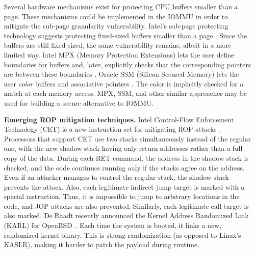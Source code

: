 Several hardware mechanisms exist for protecting CPU buffers smaller than a page. These mechanisms could be implemented in the IOMMU in order to mitigate the sub-page granularity vulnerability. Intel’s sub-page protecting technology suggests protecting fixed-sized buffers smaller than a page \cite{Int18}. Since the buffers are still fixed-sized, the same vulnerability remains, albeit in a more limited way. Intel MPX (Memory Protection Extensions) lets the user define boundaries for buffers and, later, explicitly checks that the corresponding pointers are between these boundaries \cite{Int16a}. Oracle SSM (Silicon Secured Memory) lets the user \emph{color} buffers and associative pointers \cite{Ora15}. The color is implicitly checked for a match at each memory access. MPX, SSM, and other similar approaches may be used for building a secure alternative to IOMMU. 

\smallskip
\noindent\textbf{Emerging ROP mitigation techniques.}
Intel Control-Flow Enforcement Technology (CET) is a new instruction set for mitigating ROP attacks \cite{Int17}. Processors that support CET use two stacks simultaneously instead of the regular one, with the new shadow stack having only return addresses rather than a full copy of the data. During each RET command, the address in the shadow stack is checked, and the code continues running only if the stacks agree on the address. Even if an attacker manages to control the regular stack, the shadow stack prevents the attack. Also, each legitimate indirect jump target is marked with a special instruction. Thus, it is impossible to jump to arbitrary locations in the code, and JOP attacks are also prevented. Similarly, each legitimate call target is also marked. De Raadt recently announced the Kernel Address Randomized Link (KARL) for OpenBSD~\cite{dr17}. Each time the system is booted, it links a new, randomized kernel binary. This is strong randomization (as opposed to Linux’s KASLR), making it harder to patch the payload during runtime. 


